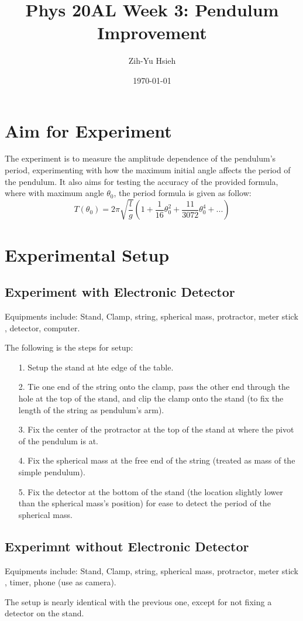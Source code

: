 \documentclass{article}
\title{Phys 20AL Week 3: Pendulum Improvement}
\author{Zih-Yu Hsieh}
\date{\today}
\begin{document}
\maketitle

\section{Aim for Experiment}
The experiment is to measure the amplitude dependence of the pendulum's period, experimenting with how the maximum initial angle affects the period of the pendulum. It also aims for testing the accuracy of the provided formula, where with maximum angle $\theta_0$, the period formula is given as follow:
$$T(\theta_0)=2\pi\sqrt{\frac{l}{g}}\left(1+\frac{1}{16}\theta_0^2+\frac{11}{3072}\theta_0^4+...\right)$$ 

\section{Experimental Setup}
\subsection{Experiment with Electronic Detector}
Equipments include: Stand, Clamp, string, spherical mass, protractor, meter stick , detector, computer.

The following is the steps for setup:
\begin{itemize}
    \item[1.] Setup the stand at hte edge of the table.
    \item[2.] Tie one end of the string onto the clamp, pass the other end through the hole at the top of the stand, and clip the clamp onto the stand (to fix the length of the string as pendulum's arm).
    \item[3.] Fix the center of the protractor at the top of the stand at where the pivot of the pendulum is at.
    \item[4.] Fix the spherical mass at the free end of the string (treated as mass of the simple pendulum).
    \item[5.] Fix the detector at the bottom of the stand (the location slightly lower than the spherical mass's position) for ease to detect the period of the spherical mass.
\end{itemize}


\subsection{Experimnt without Electronic Detector}
Equipments include: Stand, Clamp, string, spherical mass, protractor, meter stick , timer, phone (use as camera).

The setup is nearly identical with the previous one, except for not fixing a detector on the stand.
\end{document}
